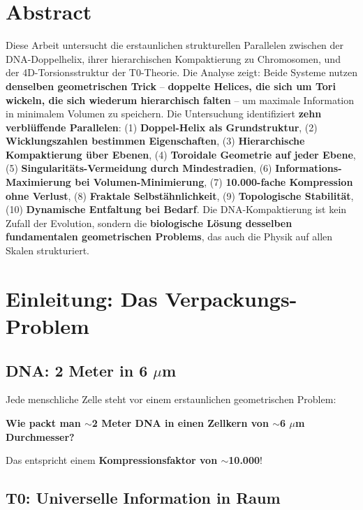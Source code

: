 \section*{Abstract}
		Diese Arbeit untersucht die erstaunlichen strukturellen Parallelen zwischen der DNA-Doppelhelix, ihrer hierarchischen Kompaktierung zu Chromosomen, und der 4D-Torsionsstruktur der T0-Theorie. Die Analyse zeigt: Beide Systeme nutzen \textbf{denselben geometrischen Trick} -- \textbf{doppelte Helices, die sich um Tori wickeln, die sich wiederum hierarchisch falten} -- um maximale Information in minimalem Volumen zu speichern. Die Untersuchung identifiziert \textbf{zehn verblüffende Parallelen}: (1) \textbf{Doppel-Helix als Grundstruktur}, (2) \textbf{Wicklungszahlen bestimmen Eigenschaften}, (3) \textbf{Hierarchische Kompaktierung über Ebenen}, (4) \textbf{Toroidale Geometrie auf jeder Ebene}, (5) \textbf{Singularitäts-Vermeidung durch Mindestradien}, (6) \textbf{Informations-Maximierung bei Volumen-Minimierung}, (7) \textbf{10.000-fache Kompression ohne Verlust}, (8) \textbf{Fraktale Selbstähnlichkeit}, (9) \textbf{Topologische Stabilität}, (10) \textbf{Dynamische Entfaltung bei Bedarf}. Die DNA-Kompaktierung ist kein Zufall der Evolution, sondern die \textbf{biologische Lösung desselben fundamentalen geometrischen Problems}, das auch die Physik auf allen Skalen strukturiert.

	
	
	
	\section{Einleitung: Das Verpackungs-Problem}
	
	\subsection{DNA: 2 Meter in 6 $\mu$m}
	
	Jede menschliche Zelle steht vor einem erstaunlichen geometrischen Problem:
	
	\begin{center}
		
		\textbf{Wie packt man $\sim$2 Meter DNA in einen Zellkern von $\sim$6 $\mu$m Durchmesser?}
	\end{center}
	
	Das entspricht einem \textbf{Kompressionsfaktor von $\sim$10.000}!
	
	\subsection{T0: Universelle Information in Raum}
	
